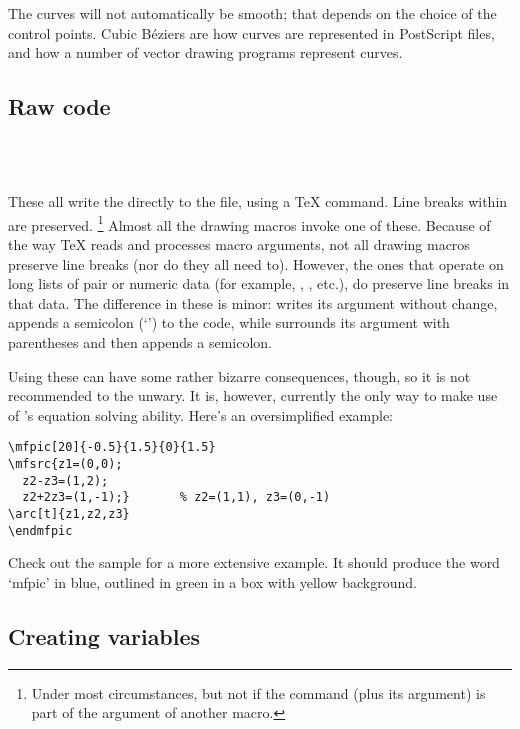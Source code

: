 \documentclass[letterpaper]{article}
\begin{document}
The curves will not automatically be smooth; that depends on the choice
of the control points. Cubic B\'eziers are how curves are represented in
PostScript files, and how a number of vector drawing programs represent
curves.

\subsection{Raw \MF{} code}\label{mfcode}

\begin{cd}
\\
\\
%
%
%
%
\end{cd}

These all write the  directly to the \MF{} file,
using a \TeX{}  command. Line breaks within  are preserved.%
    \footnote{Under most circumstances, but not if the command (plus its
    argument) is part of the argument of another macro.} %
Almost all the \mfp{} drawing macros invoke one of these. Because of the
way \TeX{} reads and processes macro arguments, not all drawing macros
preserve line breaks (nor do they all need to). However, the ones that
operate on long lists of pair or numeric data (for example, ,
, etc.), do preserve line breaks in that data. The difference
in these is minor:  writes its argument without change,
 appends a semicolon (`\mfc{;}') to the code, while
 surrounds its argument with parentheses and then appends a
semicolon.

Using these can have some rather bizarre consequences, though, so it is
not recommended to the unwary. It is, however, currently the only way to
make use of \MF{}'s equation solving ability. Here's an oversimplified
example:
\begin{verbatim}
\mfpic[20]{-0.5}{1.5}{0}{1.5}
\mfsrc{z1=(0,0);
  z2-z3=(1,2);
  z2+2z3=(1,-1);}       % z2=(1,1), z3=(0,-1)
\arc[t]{z1,z2,z3}
\endmfpic
\end{verbatim}

Check out the sample  for a more extensive example. It
should produce the word `\textsf{mfpic}' in blue, outlined in green in a
box with yellow background.

\subsection{Creating \MF{} variables}\label{variables}
\end{document}
